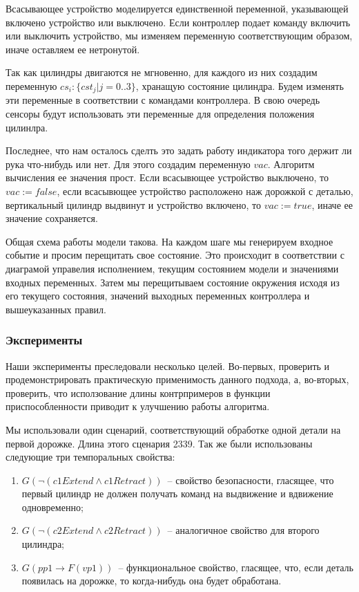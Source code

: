 \documentclass[14pt]{extarticle}
\theoremstyle{plain}
\theoremstyle{definition}
\begin{document}
Всасывающее устройство моделируется единственной переменной, указывающей
включено устройство или выключено. Если контроллер подает команду включить
или выключить устройство, мы изменяем переменную соответствующим образом,
иначе оставляем ее нетронутой.

Так как цилиндры двигаются не мгновенно, для каждого из них создадим переменную
$cs_i : \{cst_j | j = 0 .. 3 \}$, хранащую состояние цилиндра. Будем изменять
эти переменные в соответствии с командами контроллера. В свою очередь сенсоры
будут использовать эти переменные для определения положения цилинлра.

Последнее, что нам осталось сделть это задать работу индикатора того держит
ли рука что-нибудь или нет. Для этого создадим переменную $vac$. Алгоритм
вычисления ее значения прост. Если всасывющее устройство выключено, то
$vac := false$, если всасывющее устройство расположено наж дорожкой с деталью,
вертикальный цилиндр выдвинут и устройство включено, то $vac := true$, иначе
ее значение сохраняется.

Общая схема работы модели такова. На каждом шаге мы генерируем входное событие
и просим перещитать свое состояние. Это происходит в соответствии с диаграмой
управелия исполнением, текущим состоянием модели и значениями входных
переменных. Затем мы перещитываем состояние окружения исходя из его текущего
состояния, значений выходных переменных контроллера и вышеуказанных правил.

\subsubsection{Эксперименты}

Наши эксперименты преследовали несколько целей. Во-первых, проверить и
продемонстрировать практическую применимость данного подхода, а, во-вторых,
проверить, что исползование длины контрпримеров в функции приспособленности
приводит к улучшению работы алгоритма.

Мы использовали один сценарий, соответствующий обработке одной детали на
первой дорожке. Длина этого сценария 2339. Так же были использованы
следующие три темпоральных свойства:
\begin{enumerate}
    \item $G(\lnot (c1Extend \wedge c1Retract))$~-- свойство безопасности, гласящее, что
первый цилиндр не должен получать команд на выдвижение и вдвижение одновременно;
    \item $G(\lnot (c2Extend \wedge c2Retract))$~-- аналогичное свойство для второго цилиндра;
    \item $G(pp1 \rightarrow F(vp1))$~-- функциональное свойство, гласящее, что, если деталь
появилась на дорожке, то когда-нибудь она будет обработана.
\end{enumerate}
\end{document}

